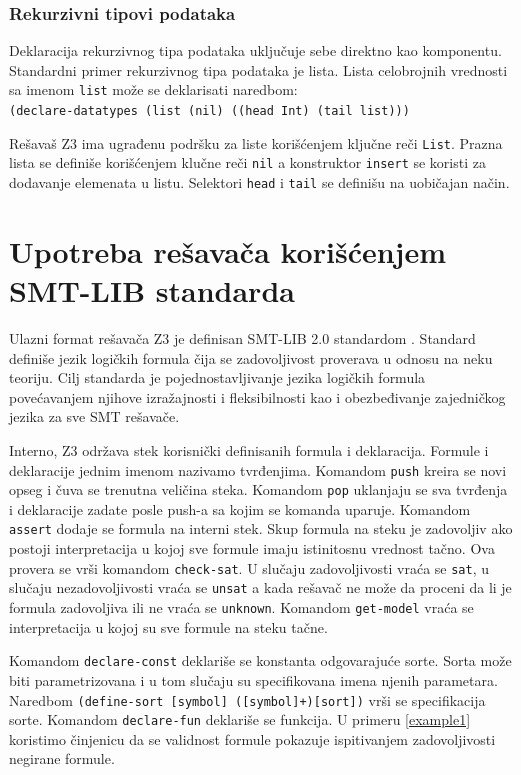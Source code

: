 \documentclass[12pt,oneside]{memoir}
\begin{document}
\subsubsection{Rekurzivni tipovi podataka}

Deklaracija rekurzivnog tipa podataka uključuje sebe direktno kao komponentu. Standardni primer rekurzivnog tipa podataka je lista. 
Lista celobrojnih vrednosti sa imenom \texttt{list} može se deklarisati naredbom:\\
\texttt{(declare-datatypes (list (nil) ((head Int) (tail list)))}
\par
Rešavaš Z3 ima ugrađenu podršku za liste korišćenjem ključne reči \texttt{List}.
Prazna lista se definiše korišćenjem klučne reči \texttt{nil} a konstruktor \texttt{insert} se koristi za dodavanje elemenata u listu. Selektori \texttt{head} i \texttt{tail} se definišu na uobičajan način.


\section{Upotreba rešavača korišćenjem SMT-LIB standarda} \label{sec:num4}
Ulazni format rešavača Z3 je definisan SMT-LIB 2.0 standardom \cite{SMTLIB}. Standard definiše jezik logičkih formula čija se zadovoljivost proverava u odnosu na neku teoriju. Cilj standarda je pojednostavljivanje jezika logičkih formula povećavanjem njihove izražajnosti i fleksibilnosti kao i obezbeđivanje zajedničkog jezika za sve SMT rešavače. 
\par
Interno, Z3 održava stek korisnički definisanih formula i deklaracija. Formule i deklaracije jednim imenom nazivamo tvrđenjima. Komandom \texttt{push} kreira se novi opseg i čuva se trenutna veličina steka. Komandom \texttt{pop} uklanjaju se sva tvrđenja i deklaracije zadate posle push-a sa kojim se komanda uparuje. Komandom \texttt{assert} dodaje se formula na interni stek. Skup formula na steku je zadovoljiv ako postoji interpretacija u kojoj sve formule imaju istinitosnu vrednost tačno. Ova provera se vrši komandom \texttt{check-sat}. U slučaju zadovoljivosti vraća se \texttt{sat}, u slučaju nezadovoljivosti vraća se \texttt{unsat} a kada rešavač ne može da proceni da li je formula zadovoljiva ili ne vraća se \texttt{unknown}. Komandom \texttt{get-model} vraća se interpretacija u kojoj su sve formule na steku tačne. 
\par

Komandom \texttt{declare-const} deklariše se konstanta odgovarajuće sorte. Sorta može biti parametrizovana i u tom slučaju su specifikovana imena njenih parametara. Naredbom \texttt{(define-sort [symbol] ([symbol]+)[sort])} vrši se specifikacija sorte.
Komandom \texttt{declare-fun} deklariše se funkcija. 
U primeru \ref{example1} koristimo činjenicu da se validnost formule pokazuje ispitivanjem zadovoljivosti negirane formule. 
\end{document}
